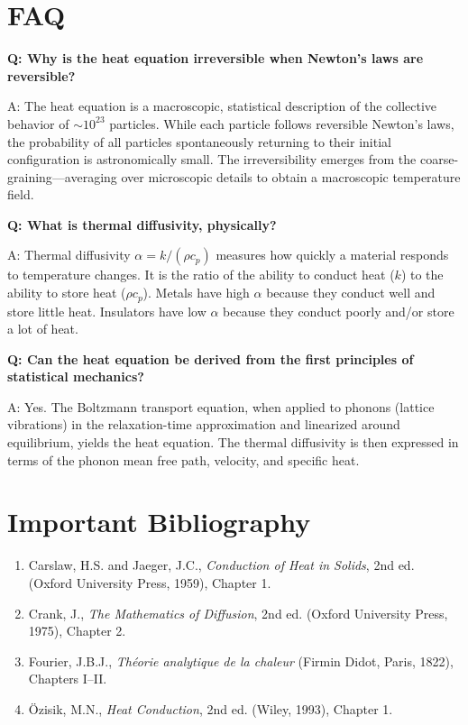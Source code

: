 \documentclass[11pt,openright]{book}
\begin{document}
\section*{FAQ}

\textbf{Q: Why is the heat equation irreversible when Newton's laws are reversible?}

A: The heat equation is a macroscopic, statistical description of the collective behavior of $\sim 10^{23}$ particles. While each particle follows reversible Newton's laws, the probability of all particles spontaneously returning to their initial configuration is astronomically small. The irreversibility emerges from the coarse-graining---averaging over microscopic details to obtain a macroscopic temperature field.

\textbf{Q: What is thermal diffusivity, physically?}

A: Thermal diffusivity $\alpha = k/(\rho c_p)$ measures how quickly a material responds to temperature changes. It is the ratio of the ability to conduct heat ($k$) to the ability to store heat ($\rho c_p$). Metals have high $\alpha$ because they conduct well and store little heat. Insulators have low $\alpha$ because they conduct poorly and/or store a lot of heat.

\textbf{Q: Can the heat equation be derived from the first principles of statistical mechanics?}

A: Yes. The Boltzmann transport equation, when applied to phonons (lattice vibrations) in the relaxation-time approximation and linearized around equilibrium, yields the heat equation. The thermal diffusivity is then expressed in terms of the phonon mean free path, velocity, and specific heat.
\section*{Important Bibliography}

\begin{enumerate}
\item Carslaw, H.S. and Jaeger, J.C., \textit{Conduction of Heat in Solids}, 2nd ed. (Oxford University Press, 1959), Chapter 1.
\item Crank, J., \textit{The Mathematics of Diffusion}, 2nd ed. (Oxford University Press, 1975), Chapter 2.
\item Fourier, J.B.J., \textit{Th\'eorie analytique de la chaleur} (Firmin Didot, Paris, 1822), Chapters I--II.
\item\"Ozisik, M.N., \textit{Heat Conduction}, 2nd ed. (Wiley, 1993), Chapter 1.
\end{enumerate}
\end{document}
